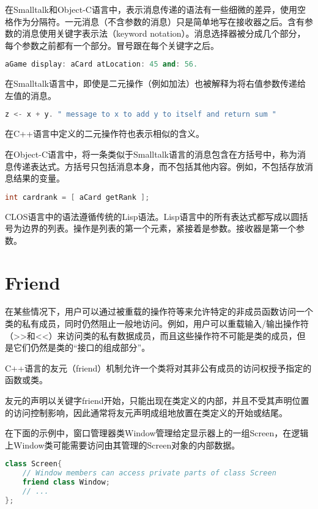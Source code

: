 在Smalltalk和Object-C语言中，表示消息传递的语法有一些细微的差异，使用空格作为分隔符。一元消息（不含参数的消息）只是简单地写在接收器之后。含有参数的消息使用关键字表示法（keyword notation）。消息选择器被分成几个部分，每个参数之前都有一个部分。冒号跟在每个关键字之后。

\begin{lstlisting}[language=C++]
aGame display: aCard atLocation: 45 and: 56.
\end{lstlisting}


在Smalltalk语言中，即使是二元操作（例如加法）也被解释为将右值参数传递给左值的消息。

\begin{lstlisting}[language=C++]
z <- x + y. " message to x to add y to itself and return sum "
\end{lstlisting}

在C++语言中定义的二元操作符也表示相似的含义。

在Object-C语言中，将一条类似于Smalltalk语言的消息包含在方括号中，称为消息传递表达式。方括号只包括消息本身，而不包括其他内容。例如，不包括存放消息结果的变量。


\begin{lstlisting}[language=C++]
int cardrank = [ aCard getRank ];
\end{lstlisting}


CLOS语言中的语法遵循传统的Lisp语法。Lisp语言中的所有表达式都写成以圆括号为边界的列表。操作是列表的第一个元素，紧接着是参数。接收器是第一个参数。

\section{Friend}

在某些情况下，用户可以通过被重载的操作符等来允许特定的非成员函数访问一个类的私有成员，同时仍然阻止一般地访问。例如，用户可以重载输入/输出操作符（>>和<<）来访问类的私有数据成员，而且这些操作符不可能是类的成员，但是它们仍然是类的“接口的组成部分”。

C++语言的友元（friend）机制允许一个类将对其非公有成员的访问权授予指定的函数或类。

友元的声明以关键字friend开始，只能出现在类定义的内部，并且不受其声明位置的访问控制影响，因此通常将友元声明成组地放置在类定义的开始或结尾。

在下面的示例中，窗口管理器类Window管理给定显示器上的一组Screen，在逻辑上Window类可能需要访问由其管理的Screen对象的内部数据。



\begin{lstlisting}[language=C++]
class Screen{
	// Window members can access private parts of class Screen
	friend class Window;
	// ...
};
\end{lstlisting}

